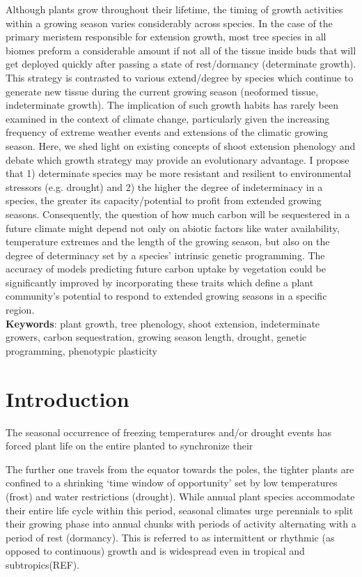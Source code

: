 \documentclass{article}
\begin{document}
	Although plants grow throughout their lifetime, the timing of growth activities within a growing season varies considerably across species. In the case of the primary meristem responsible for extension growth, most tree species in all biomes preform a considerable amount if not all of the tissue inside buds that will get deployed quickly after passing a state of rest/dormancy (determinate growth). This strategy is contrasted to various extend/degree by species which continue to generate new tissue during the current growing season (neoformed tissue, indeterminate growth). The implication of such growth habits has rarely been examined in the context of climate change, particularly given the increasing frequency of extreme weather events and extensions of the climatic growing season.  Here, we shed light on existing concepts of shoot extension phenology and debate which growth strategy may provide an evolutionary advantage. I propose that 1) determinate species may be more resistant and resilient to environmental stressors (e.g. drought) and 2) the higher the degree of indeterminacy in a species, the greater its capacity/potential to profit from extended growing seasons. Consequently, the question of how much carbon will be sequestered in a future climate might depend not only on abiotic factors like water availability, temperature extremes and the length of the growing season, but also on the degree of determinacy set by a species' intrinsic genetic programming. The accuracy of models predicting future carbon uptake by vegetation could be significantly improved by incorporating these traits which define a plant community's potential to respond to extended growing seasons in a specific region.
	\\
	
	\textbf{Keywords}: plant growth, tree phenology, shoot extension, indeterminate growers, carbon sequestration, growing season length, drought, genetic programming, phenotypic plasticity
	

	
	\section*{Introduction}
	The seasonal occurrence of freezing temperatures and/or drought events has forced plant life on the entire planted to synchronize their 
	
	The further one travels from the equator towards the poles, the tighter plants are confined to a shrinking ‘time window of opportunity’ set by low temperatures (frost) and water restrictions (drought). While annual plant species accommodate their entire life cycle within this period, seasonal climates urge perennials to split their growing phase into annual chunks with periods of activity alternating with a period of rest (dormancy). This is referred to as intermittent or rhythmic (as opposed to continuous) growth and is widespread even in tropical and subtropics(REF). 
	
\end{document}
